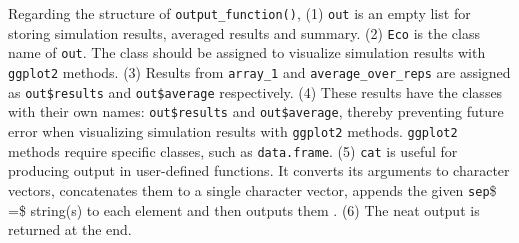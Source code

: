\documentclass[11pt,a4paper]{article}
\begin{document}
Regarding the structure of \texttt{output\_function()}, (1) \texttt{out}
is an empty list for storing simulation results, averaged results and
summary. (2) \texttt{Eco} is the class name of \texttt{out}. The class
should be assigned to visualize simulation results with \texttt{ggplot2}
methods. (3) Results from \texttt{array\_1} and
\texttt{average\_over\_reps} are assigned as \texttt{out\$results} and
\texttt{out\$average} respectively. (4) These results have the classes
with their own names: \texttt{out\$results} and \texttt{out\$average},
thereby preventing future error when visualizing simulation results with
\texttt{ggplot2} methods. \texttt{ggplot2} methods require specific
classes, such as \texttt{data.frame}. (5) \texttt{cat} is useful for
producing output in user-defined functions. It converts its arguments to
character vectors, concatenates them to a single character vector,
appends the given \texttt{sep}\$ =\$ string(s) to each element and then
outputs them \autocite{rdocumentation}. (6) The neat output is returned
at the end.
\end{document}
